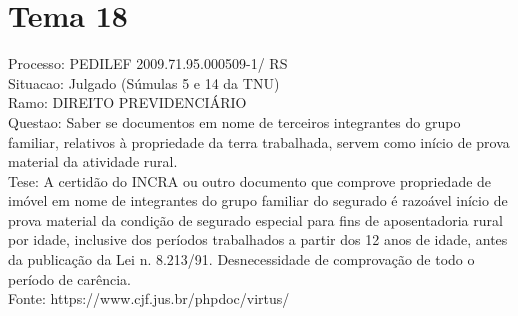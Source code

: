 \documentclass[12pt]{article}
\begin{document}
\section*{Tema 18}
Processo: PEDILEF 2009.71.95.000509-1/ RS\\
Situacao: Julgado (Súmulas 5 e 14 da TNU)\\
Ramo: DIREITO PREVIDENCIÁRIO\\
Questao: Saber se documentos em nome de terceiros integrantes do grupo familiar, relativos à propriedade da terra trabalhada, servem como início de prova material da atividade rural.\\
Tese: A certidão do INCRA ou outro documento que comprove propriedade de imóvel em nome de integrantes do grupo familiar do segurado é razoável início de prova material da condição de segurado especial para fins de aposentadoria rural por idade, inclusive dos períodos trabalhados a partir dos 12 anos de idade, antes da publicação da Lei n. 8.213/91. Desnecessidade de comprovação de todo o período de carência.\\
Fonte: https://www.cjf.jus.br/phpdoc/virtus/
\end{document}
